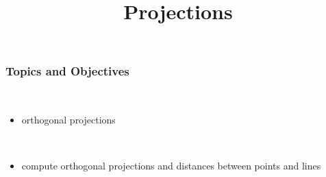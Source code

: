 \title{Projections}
\subtitle{\SubTitleName}
\institute[]{\Course}
\author{\Instructor}
\maketitle   
  

 
\begin{frame}\frametitle{Topics and Objectives}
 \\
\begin{itemize}

    \item orthogonal projections
    
\end{itemize}

\vspace{0.5cm}

\\

\LearningObjectiveStatement

\begin{itemize}
    \item compute orthogonal projections and distances between points and lines
    

\end{itemize}

\end{frame}






